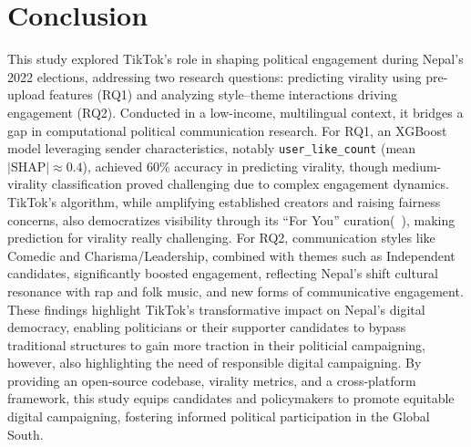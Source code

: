 \documentclass[12pt,a4paper]{report}
\begin{document}
\newpage
\chapter{Conclusion}
This study explored TikTok’s role in shaping political engagement during Nepal’s 2022 elections, addressing two research questions: predicting virality using pre-upload features (RQ1) and analyzing style–theme interactions driving engagement (RQ2). Conducted in a low-income, multilingual context, it bridges a gap in computational political communication research. For RQ1, an XGBoost model leveraging sender characteristics, notably \texttt{user\_like\_count} (mean $|\text{SHAP}| \approx 0.4$), achieved 60\% accuracy in predicting virality, though medium-virality classification proved challenging due to complex engagement dynamics. TikTok’s algorithm, while amplifying established creators and raising fairness concerns, also democratizes visibility through its ``For You'' curation(~\cite{guinaudeau2022fifteen}), making prediction for virality really challenging. For RQ2, communication styles like Comedic and Charisma/Leadership, combined with themes such as Independent candidates, significantly boosted engagement, reflecting Nepal’s shift cultural resonance with rap and folk music, and new forms of communicative engagement. These findings highlight TikTok’s transformative impact on Nepal’s digital democracy, enabling politicians or their supporter candidates to bypass traditional structures to gain more traction in their politicial campaigning, however, also highlighting the need of responsible digital campaigning. By providing an open-source codebase, virality metrics, and a cross-platform framework, this study equips candidates and policymakers to promote equitable digital campaigning, fostering informed political participation in the Global South.
\newpage
\end{document}
